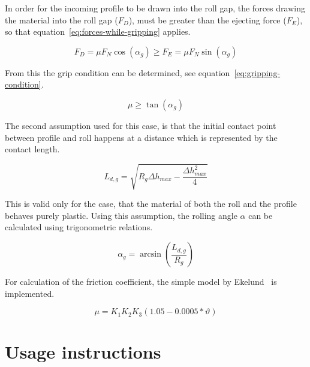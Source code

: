\documentclass[11pt]{PyRollDocs}
\begin{document}
    In order for the incoming profile to be drawn into the roll gap, the forces drawing the material into the roll gap ($F_D$),
    must be greater than the ejecting force ($F_E$), so that equation~\ref{eq:forces-while-gripping} applies.

    \begin{equation}
        F_D = \mu F_N \cos\left( \alpha_{g} \right) \geq F_E = \mu F_N \sin\left( \alpha_{g}  \right)
        \label{eq:forces-while-gripping}
    \end{equation}

    From this the grip condition can be determined, see equation~\ref{eq:gripping-condition}.

    \begin{equation}
        \mu \geq \tan\left( \alpha_{g} \right)
        \label{eq:gripping-condition}
    \end{equation}

    The second assumption used for this case, is that the initial contact point between profile and roll happens at a distance which is represented by the contact length.

    \begin{equation}
        L_{d, g} = \sqrt{R_{g} \Delta h_{max} - \frac{\Delta h_{max}^2}{4}}
        \label{eq:contact-length-gripping}
    \end{equation}

    This is valid only for the case, that the material of both the roll and the profile behaves purely plastic.
    Using this assumption, the rolling angle $\alpha$ can be calculated using trigonometric relations.

    \begin{equation}
        \alpha_g = \arcsin\left( \frac{L_{d, g}}{R_{g}} \right)
        \label{eq:gripping-angle}
    \end{equation}

    For calculation of the friction coefficient, the simple model by Ekelund~\cite{Ekelund_1927} is implemented.

    \begin{equation}
        \mu = K_1 K_2 K_3 \left( 1.05 - 0.0005 * \vartheta \right)
        \label{eq:ekelund-friction-coefficient-model}
    \end{equation}


    \section{Usage instructions}\label{sec:usage-instructions}
\end{document}
